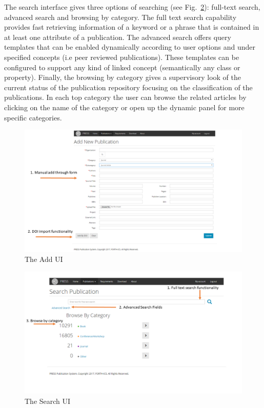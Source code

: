 \documentclass[runningheads,a4paper]{llncs}
\makeatletter
\def\maxwidth#1{\ifdim\Gin@nat@width>#1 #1\else\Gin@nat@width\fi}
\makeatother
\begin{document}
The search interface gives three options of searching (see Fig.~\ref{_Ref490666406}): full-text search, advanced search and browsing by category. The full text search capability provides fast retrieving information of a keyword or a phrase that is contained in at least one attribute of a publication. The advanced search offers query templates that can be enabled dynamically according to user options and under specified concepts (i.e peer reviewed publications). These templates can be configured to support any kind of linked concept (semantically any class or property). Finally, the browsing by category gives a supervisory look of the current status of the publication repository focusing on the classification of the publications. In each top category the user can browse the related articles by clicking on the name of the category or open up the dynamic panel for more specific categories.
\begin{figure}[h!]
\centering
\includegraphics[width=\maxwidth{\textwidth}]{./img/image3.PNG}
\cprotect\caption{The Add UI}
\label{_Ref490666384}
\end{figure}

\begin{figure}[h!]
\centering
\includegraphics[width=\maxwidth{\textwidth}]{./img/image4.PNG}
\cprotect\caption{The Search UI}
\label{_Ref490666406}
\end{figure}
\end{document}
